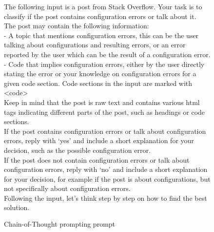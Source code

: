 \documentclass[english,bachelor]{swsLeipzig}
\begin{document}
\begin{figure}[h]
  \begin{tcolorbox}[enhanced jigsaw,drop shadow=black!50!white,colback=white]
    The following input is a post from Stack Overflow. Your task is to classify if the post contains configuration errors or talk about it.\\
  The post may contain the following information:\\
  - A topic that mentions configuration errors, this can be the user talking about configurations and resulting errors, or an error reported by the user which can be the result of a configuration error.\\
  - Code that implies configuration errors, either by the user directly stating the error or your knowledge on configuration errors for a given code section. Code sections in the input are marked with <code>\\
  Keep in mind that the post is raw text and contains various html tags indicating different parts of the post, such as headings or code sections.\\
  If the post contains configuration errors or talk about configuration errors, reply with `yes' and include a short explanation for your decision, such as the possible configuration error.\\
  If the post does not contain configuration errors or talk about configuration errors, reply with `no' and include a short explanation for your decision, for example if the post is about configurations, but not specifically about configuration errors.\\
  Following the input, let's think step by step on how to find the best solution.
  \end{tcolorbox}
  \caption{Chain-of-Thought prompting prompt}
  \label{fig:figure47}
\end{figure}
\end{document}
